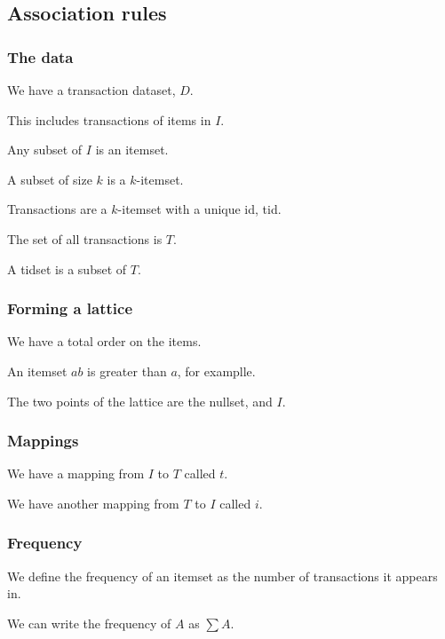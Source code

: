 
\subsection{Association rules}

\subsubsection{The data}

We have a transaction dataset, \(D\).

This includes transactions of items in \(I\).

Any subset of \(I\) is an itemset.

A subset of size \(k\) is a \(k\)-itemset.

Transactions are a \(k\)-itemset with a unique id, tid.

The set of all transactions is \(T\).

A tidset is a subset of \(T\).

\subsubsection{Forming a lattice}

We have a total order on the items.

An itemset \(ab\) is greater than \(a\), for examplle.

The two points of the lattice are the nullset, and \(I\).

\subsubsection{Mappings}

We have a mapping from \(I\) to \(T\) called \(t\).

We have another mapping from \(T\) to \(I\) called \(i\).

\subsubsection{Frequency}

We define the frequency of an itemset as the number of transactions it appears in.

We can write the frequency of \(A\) as \(\sum A\).

